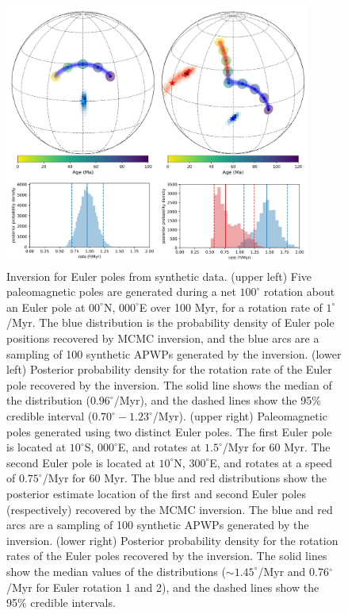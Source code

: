\documentclass[11pt,letterpaper]{article}
\begin{document}
\begin{figure}
\centering
\includegraphics[width=0.9\textwidth]{fig_synthetic_pep.png}
\caption{Inversion for Euler poles from synthetic data. (upper left) Five paleomagnetic poles are generated during a net $100^\circ$ rotation about an Euler pole at $00^\circ$N, $000^\circ$E over 100 Myr, for a rotation rate of $1^\circ$/Myr. The blue distribution is the probability density of Euler pole positions recovered by MCMC inversion, and the blue arcs are a sampling of 100 synthetic APWPs generated by the inversion. (lower left) Posterior probability density for the rotation rate of the Euler pole recovered by the inversion. The solid line shows the median of the distribution ($0.96^\circ$/Myr), and the dashed lines show the 95\% credible interval ($0.70^\circ-1.23^\circ$/Myr). (upper right) Paleomagnetic poles generated using two distinct Euler poles. The first Euler pole is located at $10^\circ$S, $000^\circ$E, and rotates at $1.5^\circ$/Myr for 60 Myr. The second Euler pole is located at $10^\circ$N, $300^\circ$E, and rotates at a speed of $0.75^\circ$/Myr for 60 Myr. The blue and red distributions show the posterior estimate location of the first and second Euler poles (respectively) recovered by the MCMC inversion. The blue and red arcs are a sampling of 100 synthetic APWPs generated by the inversion. (lower right) Posterior probability density for the rotation rates of the Euler poles recovered by the inversion. The solid lines show the median values of the distributions ($\sim 1.45^\circ$/Myr and 0.76$^\circ$/Myr for Euler rotation 1 and 2), and the dashed lines show the 95\% credible intervals.}
\label{fig:synthetic_pep}
\end{figure}
\end{document}
